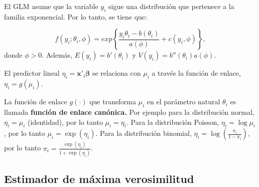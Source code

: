 \documentclass[
]{article}
\begin{document}
El GLM asume que la variable \(y_i\) sigue una distribución que pertenece a la familia exponencial. Por lo tanto, se tiene que:

\[
f(y_{i};\theta_{i},\phi)=exp\left\{\frac{y_{i}\theta_{i}-b(\theta_{i})}{a(\phi)} +c(y_{i},\phi)\right\},
\]
donde \(\phi>0\). Además, \(E(y_{i})=b'(\theta_{i})\) y \(V(y_{i})=b''(\theta_{i})a(\phi).\)

El predictor lineal \(\eta_{i}=\boldsymbol x'_{i}\boldsymbol \beta\) se relaciona con \(\mu_{i}\) a través la función de enlace, \(\eta_{i}=g(\mu_{i})\).

La función de enlace \(g(\cdot)\) que transforma \(\mu_{i}\) en el parámetro natural \(\theta_{i}\) es llamada \textbf{función de enlace canónica.} Por ejemplo para la distribución normal, \(\eta_{i}=\mu_{i}\) (identidad), por lo tanto \(\mu_{i}=\eta_{i}\). Para la distribución Poisson, \(\eta_{i}=\log\mu_{i}\), por lo tanto \(\mu_{i}=\exp(\eta_{i})\). Para la distribución binomial, \(\eta_{i}=\log\left(\frac{\pi_{i}}{1-\pi_{i}}\right)\), por lo tanto \(\pi_{i}=\frac{\exp(\eta_{i})}{1+\exp(\eta_{i})}\).

\subsection{Estimador de máxima verosimilitud}\label{estimador-de-muxe1xima-verosimilitud-1}
\end{document}
